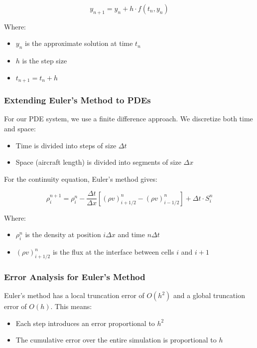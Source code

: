 \documentclass[a4paper,12pt]{article}
\begin{document}
\begin{equation}
y_{n+1} = y_n + h \cdot f(t_n, y_n)
\end{equation}

Where:
\begin{itemize}
    \item $y_n$ is the approximate solution at time $t_n$
    \item $h$ is the step size
    \item $t_{n+1} = t_n + h$
\end{itemize}

\subsubsection{Extending Euler's Method to PDEs}

For our PDE system, we use a finite difference approach. We discretize both time and space:
\begin{itemize}
    \item Time is divided into steps of size $\Delta t$
    \item Space (aircraft length) is divided into segments of size $\Delta x$
\end{itemize}

For the continuity equation, Euler's method gives:

\begin{equation}
\rho_i^{n+1} = \rho_i^n - \frac{\Delta t}{\Delta x}[(\rho v)_{i+1/2}^n - (\rho v)_{i-1/2}^n] + \Delta t \cdot S_i^n
\end{equation}

Where:
\begin{itemize}
    \item $\rho_i^n$ is the density at position $i\Delta x$ and time $n\Delta t$
    \item $(\rho v)_{i+1/2}^n$ is the flux at the interface between cells $i$ and $i+1$
\end{itemize}

\subsubsection{Error Analysis for Euler's Method}

Euler's method has a local truncation error of $O(h^2)$ and a global truncation error of $O(h)$. This means:
\begin{itemize}
    \item Each step introduces an error proportional to $h^2$
    \item The cumulative error over the entire simulation is proportional to $h$
\end{itemize}
\end{document}
